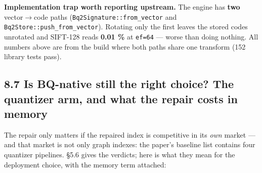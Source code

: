\documentclass[
  10pt,
]{article}
\begin{document}
\textbf{Implementation trap worth reporting upstream.} The engine has
\textbf{two} vector$\rightarrow$code paths (\texttt{Bq2Signature::from\_vector} and
\texttt{Bq2Store::push\_from\_vector}). Rotating only the first leaves
the stored codes unrotated and SIFT-128 reads \textbf{0.01 \%} at
\texttt{ef=64} --- worse than doing nothing. All numbers above are from
the build where both paths share one transform (152 library tests pass).

\subsection{8.7 Is BQ-native still the right choice? The quantizer arm,
and what the repair costs in
memory}\label{is-bq-native-still-the-right-choice-the-quantizer-arm-and-what-the-repair-costs-in-memory}

The repair only matters if the repaired index is competitive in its
\emph{own} market --- and that market is not only graph indexes: the
paper's baseline list contains four quantizer pipelines. §5.6 gives the
verdicts; here is what they mean for the deployment choice, with the
memory term attached:
\end{document}
